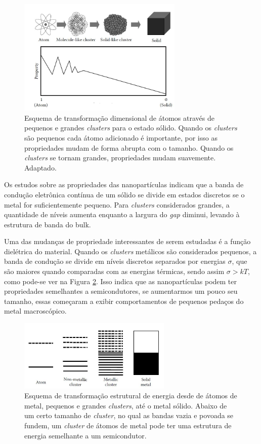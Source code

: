 \begin{figure}
  \centering
  \includegraphics[width=0.7\textwidth]{images/clusters/atomo_cluste_solido}
  \caption{Esquema de transformação dimensional de átomos através de pequenos e grandes \textit{clusters} para o estado sólido. Quando os \textit{clusters} são pequenos cada átomo adicionado é importante, por isso as propriedades mudam
de forma abrupta com o tamanho. Quando os \textit{clusters} se tornam grandes,
propriedades mudam suavemente\cite{cap06_Nanophysics}. Adaptado.  }
  \label{fig:transicao_cluster_solido}
\end{figure}


Os estudos sobre as propriedades das nanopartículas indicam que a banda de condução eletrônica contínua de um sólido se divide em estados discretos se o metal for suficientemente pequeno. Para \textit{clusters} considerados grandes, a quantidade de níveis aumenta enquanto a largura do \textit{gap} diminui, levando à estrutura de banda do bulk.

Uma das mudanças de propriedade interessantes de serem estudadas é a função dielétrica do material. Quando os \textit{clusters} metálicos são considerados pequenos, a banda de condução se divide em níveis discretos separados por energias $\sigma$, que são maiores quando comparadas com as energias térmicas, sendo assim $\sigma>kT$, como pode-se ver na Figura \ref{fig:carac_metal}. Isso indica que as nanopartículas podem ter propriedades semelhantes a semicondutores, se aumentarmos um pouco seu tamanho, essas começaram a exibir comportamentos de pequenos pedaços do metal macroscópico.

\begin{figure}
  \centering
  \includegraphics[width=0.65\textwidth]{images/clusters/carac_metal}
  \caption{ Esquema de transformação estrutural de energia desde de átomos de metal, pequenos e grandes \textit{clusters}, até o metal sólido. Abaixo de um certo tamanho de \textit{cluster}, no qual as bandas vazia e povoada se fundem, um \textit{cluster} de átomos de metal pode ter uma estrutura de energia semelhante a um semicondutor.\cite{dissertacao_anderson}  }
  \label{fig:carac_metal}
\end{figure}

